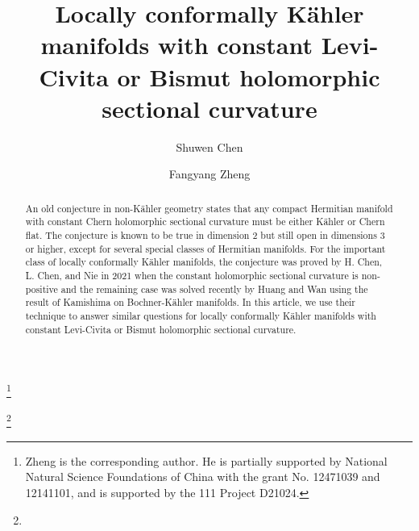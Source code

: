 \documentclass{amsart}
\numberwithin{equation}{section}
\begin{document}
\title[Locally conformally K\"ahler manifolds with constant Levi-Civita or Bismut holomorphic sectional curvature]
{Locally conformally K\"ahler manifolds with constant Levi-Civita or Bismut holomorphic sectional curvature}

\author{Shuwen Chen}
\address{Shuwen Chen. School of Mathematical Sciences, Chongqing Normal University, Chongqing 401331, China}
\thanks{Zheng is the corresponding author. He is partially supported by National Natural Science Foundations of China
with the grant No. 12471039 and  12141101, and is supported by the 111 Project D21024.}
	

\author{Fangyang Zheng}
\address{Fangyang Zheng. School of Mathematical Sciences, Chongqing Normal University, Chongqing 401331, China}
 \thanks{}

\date{}



\begin{abstract}
An old conjecture in non-K\"ahler geometry states that any compact Hermitian manifold with constant Chern holomorphic sectional curvature must be either K\"ahler or Chern flat. The conjecture is known to be true in dimension 2 but still open in dimensions 3 or higher, except for several special classes of Hermitian manifolds. For the important class of locally conformally K\"ahler manifolds, the conjecture was proved by H. Chen, L. Chen, and Nie in 2021 when the constant holomorphic sectional curvature is non-positive and the remaining case was solved recently by Huang and Wan using the result of Kamishima on Bochner-K\"ahler manifolds. In this article, we use their technique to answer similar questions for locally conformally K\"ahler manifolds with constant Levi-Civita or Bismut holomorphic sectional curvature.
\end{abstract}


\maketitle

\end{document}
